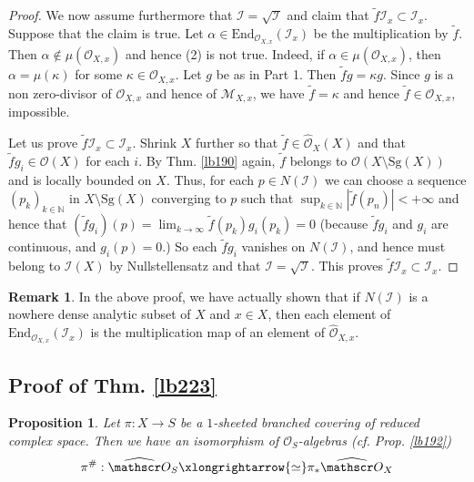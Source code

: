\documentclass[12pt,b5paper,notitlepage]{report}
\theoremstyle{definition}
\newtheorem{rem}[df]{Remark}
\theoremstyle{plain}
\newtheorem{pp}[df]{Proposition}
\newcommand{\mc}{\mathcal}
\newcommand{\wtd}{\widetilde}
\newcommand{\wht}{\widehat}
\newcommand{\End}{\mathrm{End}} %
\newcommand{\scr}{\mathscr}
\newcommand{\Nbb}{\mathbb N}
\newcommand{\Sg}{\mathrm{Sg}}
\newcommand{\Owht}{\widehat{\scr O}}
\numberwithin{equation}{section}
\begin{document}
\begin{proof}
We now assume furthermore that $\mc I=\sqrt{\mc I}$ and claim that $\wtd f\mc I_x\subset\mc I_x$. Suppose that the claim is true. Let $\alpha\in \End_{\scr O_{X,x}}(\mc I_x)$ be the multiplication by $\wtd f$. Then $\alpha\notin\mu(\scr O_{X,x})$ and hence (2) is not true. Indeed, if $\alpha\in\mu(\scr O_{X,x})$, then $\alpha=\mu(\kappa)$ for some $\kappa\in\scr O_{X,x}$. Let $g$ be as in Part 1. Then $\wtd fg=\kappa g$. Since $g$ is a non zero-divisor of $\scr O_{X,x}$ and hence of $\scr M_{X,x}$, we have $\wtd f=\kappa$ and hence $\wtd f\in\scr O_{X,x}$, impossible.

Let us prove $\wtd f\mc I_x\subset\mc I_x$. Shrink $X$ further so that $\wtd f\in\Owht_X(X)$ and that $\wtd fg_i\in\scr O(X)$ for each $i$. By Thm. \ref{lb190} again, $\wtd f$ belongs to $\scr O(X\setminus \Sg(X))$ and is locally bounded on $X$. Thus, for each $p\in N(\mc I)$ we can choose a sequence $(p_k)_{k\in\Nbb}$ in $X\setminus\Sg(X)$ converging to $p$ such that $\displaystyle\sup_{k\in\Nbb}|\wtd f(p_n)|<+\infty$ and hence that $\displaystyle(\wtd f g_i)(p)=\lim_{k\rightarrow\infty}\wtd f(p_k)g_i(p_k)=0$ (because $\wtd fg_i$ and $g_i$ are continuous, and $g_i(p)=0$.) So each $\wtd fg_i$ vanishes on $N(\mc I)$, and hence must belong to $\mc I(X)$ by Nullstellensatz and that $\mc I=\sqrt{\mc I}$. This proves $\wtd f\mc I_x\subset\mc I_x$. 
\end{proof}


\begin{rem}
In the above proof, we have actually shown that if $N(\mc I)$ is a nowhere dense analytic subset of $X$ and $x\in X$, then each element of $\End_{\scr O_{X,x}}(\mc I_x)$ is the multiplication map of an element of $\wht{\scr O}_{X,x}$.
\end{rem}




\subsection{Proof of Thm. \ref{lb223}}


\begin{pp}\label{lb225}
Let $\pi:X\rightarrow S$ be a $1$-sheeted branched covering of reduced complex space. Then we have an isomorphism of $\scr O_S$-algebras (cf. Prop. \ref{lb192})
\begin{align*}
\pi^\#:\Owht_S\xlongrightarrow{\simeq}\pi_*\Owht_X
\end{align*}
\end{pp}
\end{document}
